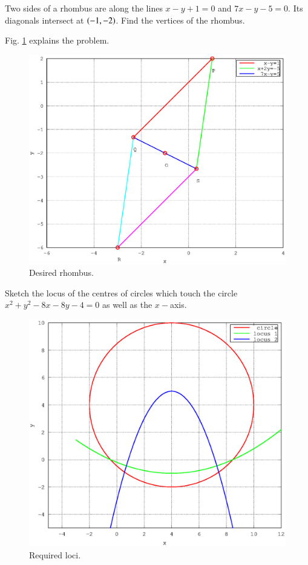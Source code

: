 \documentclass[journal,12pt,twocolumn]{IEEEtran}
\begin{document}
%
\begin{problem}
Two sides of a rhombus are along the lines $x-y+1 = 0$ and $7x-y-5=0$. Its diagonals intersect at $\left(-1,-2\right)$. Find the vertices of the rhombus.
\end{problem}
\solution

Fig. \ref{fig_34} explains the problem.

%
\begin{figure}[h]
\centering
\includegraphics[width=\columnwidth]{./version_2/ee16b1034/ee16b1034}
\caption{ Desired rhombus.}
\label{fig_34}	
\end{figure}
%
\begin{problem}
Sketch the locus of the centres of circles which touch the circle $x^2+y^2-8x-8y-4=0$ as well as the $x-$axis. 
\end{problem}
\solution


%
\begin{figure}[h]
\centering
\includegraphics[width=\columnwidth]{./version_2/ee16b1035/ee16b1035}
\caption{ Required loci.}
\label{fig_35}	
\end{figure}
\end{document}
